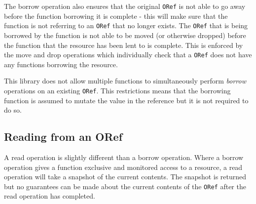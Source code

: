 \documentclass[onehalf,11pt]{beavtex}
\begin{document}
The borrow operation also ensures that the original \texttt{ORef} is not able to
go away before the function borrowing it is complete - this will make sure that
the function is not referring to an \texttt{ORef} that no longer exists.
The \texttt{ORef} that is being borrowed by the function is not able to be moved
(or otherwise dropped) before the function that the resource has been lent to is
complete. This is enforced by the move and drop operations which individually
check that a \texttt{ORef} does not have any functions borrowing the resource.

This library does not allow multiple functions to simultaneously perform
\textit{borrow} operations on an existing \texttt{ORef}.
This restrictions means that the borrowing function is assumed to mutate the
value in the reference but it is not required to do so.








\subsection{Reading from an ORef}

A read operation is slightly different than a borrow operation. Where a borrow
operation gives a function exclusive and monitored access to a resource, a read
operation will take a snapshot of the current contents. The snapshot is returned
but no guarantees can be made about the current contents of the \texttt{ORef}
after the read operation has completed.
\end{document}
